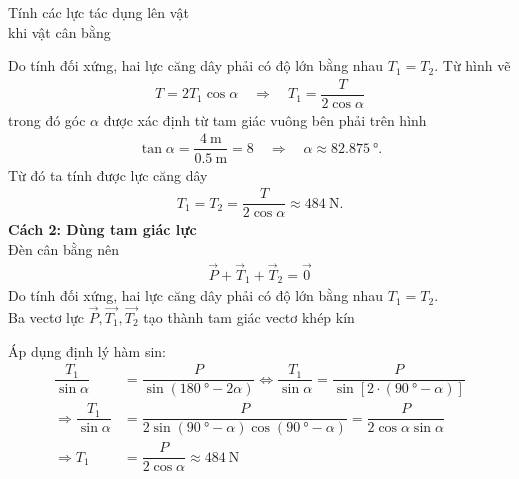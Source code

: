 \begin{dang}{Tính các lực tác dụng lên vật \\khi vật cân bằng}
{{		Do tính đối xứng, hai lực căng dây phải có độ lớn bằng nhau $T_1=T_2$. Từ hình vẽ 
		\begin{align*}
			T=2T_1\cos \alpha\quad\Rightarrow\quad T_1=\dfrac{T}{2\cos\alpha}
		\end{align*}
		trong đó góc $\alpha$ được xác định từ tam giác vuông bên phải trên hình
		\begin{align*}
			\tan\alpha=\dfrac{\SI{4}{\meter}}{\SI{0.5}{\meter}}=8\quad\Rightarrow\quad \alpha\approx\SI{82.875}{\degree}. 
		\end{align*}
		Từ đó ta tính được lực căng dây
		\begin{align*}
			T_1=T_2=\dfrac{T}{2\cos\alpha}\approx \SI{484}{\newton}.
		\end{align*}		
	\textbf{Cách 2: Dùng tam giác lực}\\
	Đèn cân bằng nên
	\begin{align*}
		\vec{P}+\vec{T}_1+\vec{T}_2=\overrightarrow{0}
	\end{align*}
Do tính đối xứng, hai lực căng dây phải có độ lớn bằng nhau $T_1=T_2$.\\
Ba vectơ lực $\vec{P}, \overrightarrow{T_1}, \overrightarrow{T_2}$ tạo thành tam giác vectơ khép kín
	\begin{center}
\end{center}
Áp dụng định lý hàm sin:
\begin{align*}
	\dfrac{T_1}{\sin\alpha}&=\dfrac{P}{\sin\left(\SI{180}{\degree}-2\alpha\right)}\Leftrightarrow \dfrac{T_1}{\sin\alpha}=\dfrac{P}{\sin\left[2\cdot\left(\SI{90}{\degree}-\alpha\right)\right]}\\
	\Rightarrow \dfrac{T_1}{\sin\alpha}&=\dfrac{P}{2\sin\left(\SI{90}{\degree}-\alpha\right)\cos\left(\SI{90}{\degree}-\alpha\right)}=\dfrac{P}{2\cos\alpha\sin\alpha}\\
	\Rightarrow T_1&=\dfrac{P}{2\cos\alpha}\approx\SI{484}{\newton}
\end{align*}
	}}
	
	
\end{dang}